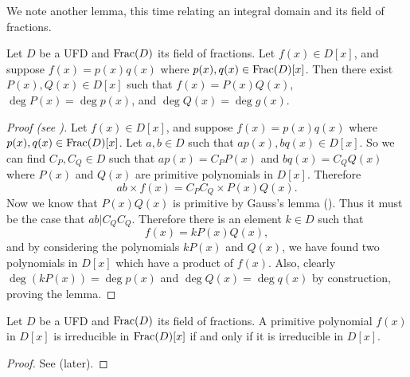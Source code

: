 We note another lemma, this time relating an integral domain and its field of fractions.

\begin{lemma}\label{lemma-reducible-in-field-of-fractions-means-reducible-in-UFD}
    Let $D$ be a UFD and $\mathrm{Frac}(D)$ its field of fractions. Let $f(x) \in D[x]$, and suppose $f(x) = p(x)q(x)$ where $p(x), q(x) \in \mathrm{Frac}(D)[x]$. Then there exist $P(x), Q(x) \in D[x]$ such that $f(x) = P(x)Q(x)$, $\deg P(x) = \deg p(x)$, and $\deg Q(x) = \deg g(x)$.
\end{lemma}
\begin{proof}[Proof (see {\cite[Lemma 18.26]{judson_beezer_2022}})]
    Let $f(x) \in D[x]$, and suppose $f(x) = p(x)q(x)$ where $p(x), q(x) \in \mathrm{Frac}(D)[x]$. Let $a, b\in D$ such that $ap(x), bq(x) \in D[x]$. So we can find $C_P, C_Q \in D$ such that $ap(x) = C_P P(x)$ and $bq(x) = C_Q Q(x)$ where $P(x)$ and $Q(x)$ are primitive polynomials in $D[x]$. Therefore
    \[
        ab\times f(x) = C_P C_Q \times P(x)Q(x).
    \]
    Now we know that $P(x)Q(x)$ is primitive by Gauss's lemma (). Thus it must be the case that $ab \vert C_QC_Q$. Therefore there is an element $k \in D$ such that
    \[
        f(x) = k P(x)Q(x),
    \]
    and by considering the polynomials $k P(x)$ and $Q(x)$, we have found two polynomials in $D[x]$ which have a product of $f(x)$. Also, clearly $\deg (kP(x)) = \deg p(x)$ and $\deg Q(x) = \deg q(x)$ by construction, proving the lemma.
\end{proof}

\begin{corollary}\label{corollary-primitive-polynomial-irreducible-iff-polynomial-irreducible-in-field-of-fractions}
    Let $D$ be a UFD and $\mathrm{Frac}(D)$ its field of fractions. A primitive polynomial $f(x)$ in $D[x]$ is irreducible in $\mathrm{Frac}(D)[x]$ if and only if it is irreducible in $D[x]$.
\end{corollary}
\begin{proof}
    See  (later).
\end{proof}

